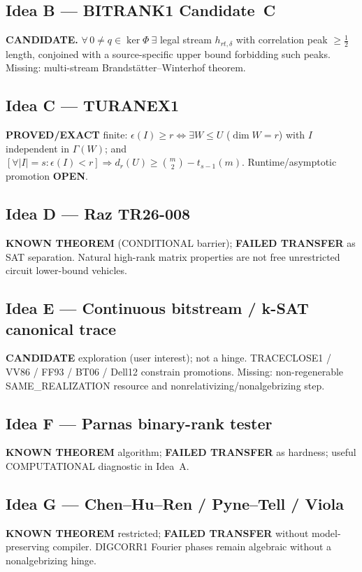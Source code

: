 \documentclass[11pt]{article}
\begin{document}
\subsection*{Idea B --- BITRANK1 Candidate~C}
\textbf{CANDIDATE.} $\forall\,0\neq q\in\ker\Phi\ \exists$ legal stream $h_{rt,\delta}$ with
correlation peak $\ge\tfrac12$ length, conjoined with a source-specific upper bound forbidding
such peaks. Missing: multi-stream Brandst\"atter--Winterhof theorem.

\subsection*{Idea C --- TURANEX1}
\textbf{PROVED/EXACT} finite: $\epsilon(I)\ge r\iff\exists W\le U$ ($\dim W=r$) with $I$
independent in $\Gamma(W)$; and $[\forall|I|=s:\epsilon(I)<r]\Rightarrow
d_r(U)\ge\binom{m}{2}-t_{s-1}(m)$. Runtime/asymptotic promotion \textbf{OPEN}.

\subsection*{Idea D --- Raz TR26-008}
\textbf{KNOWN THEOREM} (CONDITIONAL barrier); \textbf{FAILED TRANSFER} as SAT separation.
Natural high-rank matrix properties are not free unrestricted circuit lower-bound vehicles.

\subsection*{Idea E --- Continuous bitstream / k-SAT canonical trace}
\textbf{CANDIDATE} exploration (user interest); not a hinge. TRACECLOSE1 / VV86 / FF93 / BT06 /
Dell12 constrain promotions. Missing: non-regenerable SAME\_REALIZATION resource and
nonrelativizing/nonalgebrizing step.

\subsection*{Idea F --- Parnas binary-rank tester}
\textbf{KNOWN THEOREM} algorithm; \textbf{FAILED TRANSFER} as hardness; useful COMPUTATIONAL
diagnostic in Idea~A.

\subsection*{Idea G --- Chen--Hu--Ren / Pyne--Tell / Viola}
\textbf{KNOWN THEOREM} restricted; \textbf{FAILED TRANSFER} without model-preserving compiler.
DIGCORR1 Fourier phases remain algebraic without a nonalgebrizing hinge.
\end{document}

